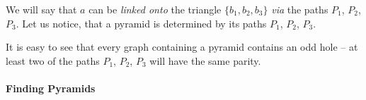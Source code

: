 We will say that $a$ can be \emph{linked onto} the triangle $\{b_1, b_2, b_3\}$ \emph{via} the paths $P_1$, $P_2$, $P_3$. Let us notice, that a pyramid is determined by its paths $P_1$, $P_2$, $P_3$.

It is easy to see that every graph containing a pyramid contains an odd hole -- at least two of the paths $P_1$, $P_2$, $P_3$ will have the same parity.

\paragraph{Finding Pyramids}



